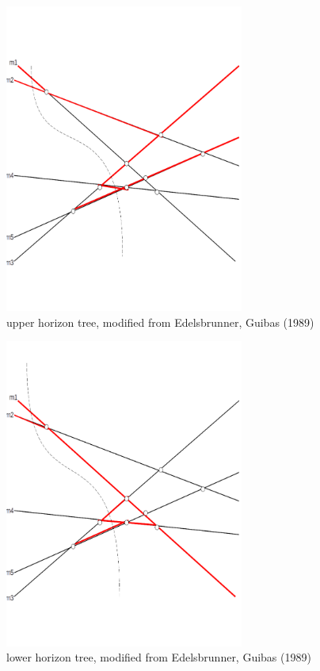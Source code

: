 \documentclass[12pt]{article}
\begin{document}
        \begin{figure}
            \center
            \includegraphics[width=0.7\textwidth]{uht.png}
            \caption{upper horizon tree, modified from Edelsbrunner, Guibas (1989)}
            \label{figure.uht}
        \end{figure}

        \begin{figure}
            \center
            \includegraphics[width=0.7\textwidth]{lht.png}
            \caption{lower horizon tree, modified from Edelsbrunner, Guibas (1989)}
            \label{figure.lht}
        \end{figure}
\end{document}
